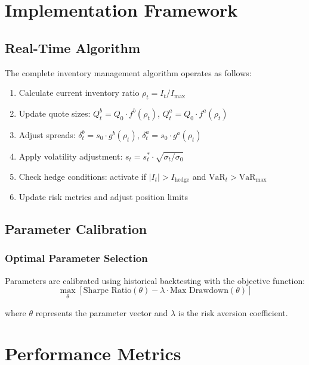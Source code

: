 \documentclass[11pt,a4paper]{article}
\theoremstyle{definition}
\begin{document}
\section{Implementation Framework}

\subsection{Real-Time Algorithm}

The complete inventory management algorithm operates as follows:

\begin{enumerate}
    \item Calculate current inventory ratio $\rho_t = I_t/I_{\max}$
    \item Update quote sizes: $Q_t^b = Q_0 \cdot f^b(\rho_t)$, $Q_t^a = Q_0 \cdot f^a(\rho_t)$
    \item Adjust spreads: $\delta_t^b = s_0 \cdot g^b(\rho_t)$, $\delta_t^a = s_0 \cdot g^a(\rho_t)$
    \item Apply volatility adjustment: $s_t = s_t^* \cdot \sqrt{\sigma_t/\sigma_0}$
    \item Check hedge conditions: activate if $|I_t| > I_{\text{hedge}}$ and $\text{VaR}_t > \text{VaR}_{\max}$
    \item Update risk metrics and adjust position limits
\end{enumerate}

\subsection{Parameter Calibration}

\subsubsection{Optimal Parameter Selection}

Parameters are calibrated using historical backtesting with the objective function:
\begin{equation}
\max_{\theta} \left[\text{Sharpe Ratio}(\theta) - \lambda \cdot \text{Max Drawdown}(\theta)\right]
\end{equation}

where $\theta$ represents the parameter vector and $\lambda$ is the risk aversion coefficient.

\section{Performance Metrics}
\end{document}
